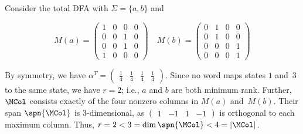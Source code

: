 \begin{exa} \label{ex:snap1}
Consider the total DFA with $\Sigma = \{a,b\}$ and
\begin{figure}[H]
    \centering
    \begin{subfigure}[c]{0.65\textwidth} \centering
\[
M(a) = \begin{pmatrix} 1 & 0 & 0 & 0 \\ 0 & 0 & 1 & 0 \\ 0 & 0 & 1 & 0 \\ 1 & 0 & 0 & 0 \end{pmatrix} \quad
M(b) = \begin{pmatrix} 0 & 1 & 0 & 0 \\ 0 & 1 & 0 & 0 \\ 0 & 0 & 0 & 1 \\ 0 & 0 & 0 & 1 \end{pmatrix}\]
\end{subfigure}
\begin{subfigure}[c]{0.30\textwidth} \centering
{}
\end{subfigure}
\end{figure}

\noindent
By symmetry, we have $\alpha^T = \begin{pmatrix} \frac14 & \frac14 & \frac14 & \frac14 \end{pmatrix}$.
Since no word maps states $1$ and~$3$ to the same state, we have $r=2$; i.e., $a$ and $b$ are both minimum rank.
Further, $\MCol$ consists exactly of the four nonzero columns in $M(a)$ and~$M(b)$. 
Their span $\spn{\MCol}$ is $3$-dimensional, as $\begin{pmatrix}1 & -1 & 1 & -1\end{pmatrix}$ is orthogonal to each maximum column.
Thus, $r = 2 < 3 = \dim \spn{\MCol} < 4 = |\MCol|$.
\end{exa}


